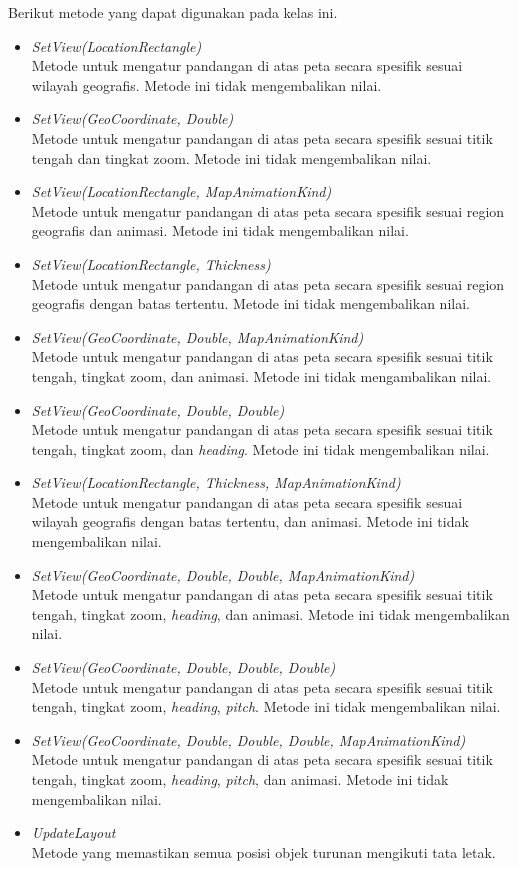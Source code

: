 Berikut metode yang dapat digunakan pada kelas ini.
\begin{itemize}
	\item \textit{SetView(LocationRectangle)} \\
	Metode untuk mengatur pandangan di atas peta secara spesifik sesuai wilayah geografis. Metode ini tidak mengembalikan nilai.
	\item \textit{SetView(GeoCoordinate, Double)} \\
	Metode untuk mengatur pandangan di atas peta secara spesifik sesuai titik tengah dan tingkat zoom. Metode ini tidak mengembalikan nilai.
	\item \textit{SetView(LocationRectangle, MapAnimationKind)}\\
	Metode untuk mengatur pandangan di atas peta secara spesifik sesuai region geografis dan animasi. Metode ini tidak mengembalikan nilai.
	\item \textit{SetView(LocationRectangle, Thickness)} \\
	Metode untuk mengatur pandangan di atas peta secara spesifik sesuai region geografis dengan batas tertentu. Metode ini tidak mengembalikan nilai.
	\item \textit{SetView(GeoCoordinate, Double, MapAnimationKind)} \\
	Metode untuk mengatur pandangan di atas peta secara spesifik sesuai titik tengah, tingkat zoom, dan animasi. Metode ini tidak mengambalikan nilai.
	\item \textit{SetView(GeoCoordinate, Double, Double)} \\
	Metode untuk mengatur pandangan di atas peta secara spesifik sesuai titik tengah, tingkat zoom, dan \textit{heading}. Metode ini tidak mengembalikan nilai.
	\item \textit{SetView(LocationRectangle, Thickness, MapAnimationKind)} \\
	Metode untuk mengatur pandangan di atas peta secara spesifik sesuai wilayah geografis dengan batas tertentu, dan animasi. Metode ini tidak mengembalikan nilai.
	\item \textit{SetView(GeoCoordinate, Double, Double, MapAnimationKind)} \\
	Metode untuk mengatur pandangan di atas peta secara spesifik sesuai titik tengah, tingkat zoom, \textit{heading}, dan animasi. Metode ini tidak mengembalikan nilai.	
	\item \textit{SetView(GeoCoordinate, Double, Double, Double)} \\
	Metode untuk mengatur pandangan di atas peta secara spesifik sesuai titik tengah, tingkat zoom, \textit{heading}, \textit{pitch}. Metode ini tidak mengembalikan nilai.
	\item \textit{SetView(GeoCoordinate, Double, Double, Double, MapAnimationKind)} \\
	Metode untuk mengatur pandangan di atas peta secara spesifik sesuai titik tengah, tingkat zoom, \textit{heading}, \textit{pitch}, dan animasi. Metode ini tidak mengembalikan nilai.
	\item \textit{UpdateLayout} \\
	Metode yang memastikan semua posisi objek turunan mengikuti tata letak. 
\end{itemize}

